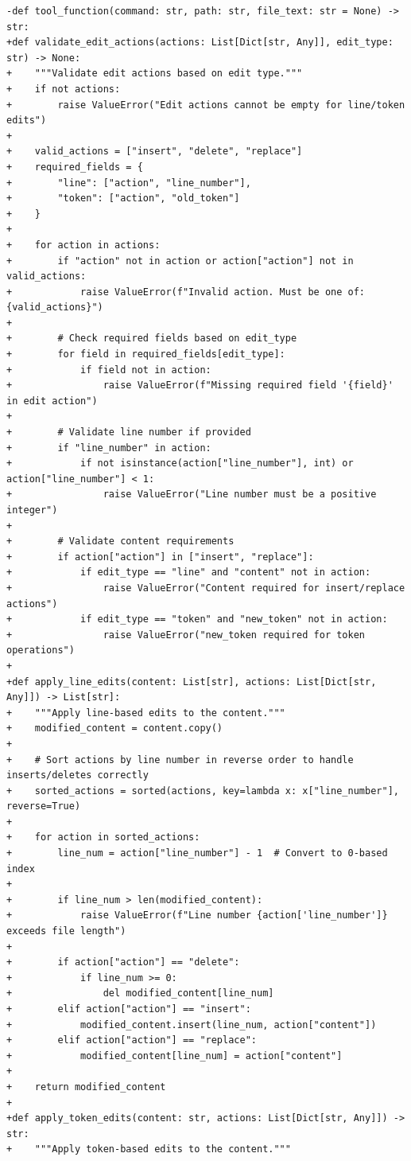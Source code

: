 \documentclass{article} %
\begin{document}
\begin{lstlisting}[style=diffstyle]
-def tool_function(command: str, path: str, file_text: str = None) -> str:
+def validate_edit_actions(actions: List[Dict[str, Any]], edit_type: str) -> None:
+    """Validate edit actions based on edit type."""
+    if not actions:
+        raise ValueError("Edit actions cannot be empty for line/token edits")
+
+    valid_actions = ["insert", "delete", "replace"]
+    required_fields = {
+        "line": ["action", "line_number"],
+        "token": ["action", "old_token"]
+    }
+
+    for action in actions:
+        if "action" not in action or action["action"] not in valid_actions:
+            raise ValueError(f"Invalid action. Must be one of: {valid_actions}")
+
+        # Check required fields based on edit_type
+        for field in required_fields[edit_type]:
+            if field not in action:
+                raise ValueError(f"Missing required field '{field}' in edit action")
+
+        # Validate line number if provided
+        if "line_number" in action:
+            if not isinstance(action["line_number"], int) or action["line_number"] < 1:
+                raise ValueError("Line number must be a positive integer")
+
+        # Validate content requirements
+        if action["action"] in ["insert", "replace"]:
+            if edit_type == "line" and "content" not in action:
+                raise ValueError("Content required for insert/replace actions")
+            if edit_type == "token" and "new_token" not in action:
+                raise ValueError("new_token required for token operations")
+
+def apply_line_edits(content: List[str], actions: List[Dict[str, Any]]) -> List[str]:
+    """Apply line-based edits to the content."""
+    modified_content = content.copy()
+    
+    # Sort actions by line number in reverse order to handle inserts/deletes correctly
+    sorted_actions = sorted(actions, key=lambda x: x["line_number"], reverse=True)
+
+    for action in sorted_actions:
+        line_num = action["line_number"] - 1  # Convert to 0-based index
+        
+        if line_num > len(modified_content):
+            raise ValueError(f"Line number {action['line_number']} exceeds file length")
+
+        if action["action"] == "delete":
+            if line_num >= 0:
+                del modified_content[line_num]
+        elif action["action"] == "insert":
+            modified_content.insert(line_num, action["content"])
+        elif action["action"] == "replace":
+            modified_content[line_num] = action["content"]
+
+    return modified_content
+
+def apply_token_edits(content: str, actions: List[Dict[str, Any]]) -> str:
+    """Apply token-based edits to the content."""

\end{lstlisting}
\end{document}

